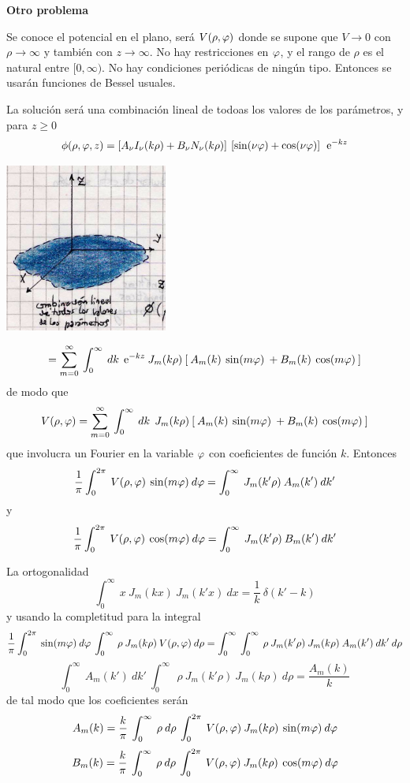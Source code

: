 \documentclass[10pt,oneside]{CBFT_book}
\begin{document}
\begin{ejemplo}{\bf Otro problema}
 
Se conoce el potencial en el plano, será $V(\rho,\varphi)$ donde se supone que $V \to 0$
con $\rho\to\infty$ y también con $z\to\infty$.
No hay restricciones en $\varphi$, y el rango de $\rho$ es el natural entre $[0,\infty)$.
No hay condiciones periódicas de ningún tipo.
Entonces se usarán funciones de Bessel usuales.

La solución será una combinación lineal de todoas los valores de los parámetros,
y para $z\geq 0$
\[
	\phi(\rho,\varphi,z) = \left[ A_{\nu}I_{\nu}(k\rho) + B_{\nu}N_{\nu}(k\rho) \right] \: 
	\left[ \sin(\nu\varphi) + \cos(\nu\varphi) \right] \: \:\mathrm{e}^{-kz}
\]
 
\includegraphics[width=0.4\textwidth]{images/fig_ft1_sep_cilin_B.jpg} 

\[
	= \sum_{m=0}^\infty \: \int_0^{\infty} \: dk \:
	\:\mathrm{e}^{-kz} \: J_{m}(k\rho) \: 
	[ \: A_m(k) \: \sin(m\varphi) \: + B_m(k) \: \cos(m\varphi) \: ]
\]
de modo que
\[
	V(\rho,\varphi) = \sum_{m=0}^\infty \: \int_0^{\infty} \: dk \:
	\: J_{m}(k\rho) \: 
	[ \: A_m(k) \: \sin(m\varphi) \: + B_m(k) \: \cos(m\varphi) \: ]
\]
que involucra un Fourier en la variable $\varphi$ con coeficientes de función $k$.
Entonces
\[
	\frac{1}{\pi} \int_0^{2\pi} \: V(\rho,\varphi) \: \sin(m\varphi) \: d\varphi = 
	\int_0^{\infty} \: J_{m}(k'\rho) \: A_m(k') \: dk'
\]
y
\[
	\frac{1}{\pi} \int_0^{2\pi} \: V(\rho,\varphi) \: \cos(m\varphi) \: d\varphi = 
	\int_0^{\infty} \: J_{m}(k'\rho) \: B_m(k') \: dk'
\]

La ortogonalidad
\[
	\int_0^{\infty} \: x \: J_{m}(kx) \: J_{m}(k'x) \: dx = \frac{1}{k} \: \delta(k'-k)
\]
y usando la completitud para la integral
\[
	\frac{1}{\pi} \int_0^{2\pi} \:  \sin(m\varphi) \: d\varphi \: 
	\int_0^{\infty} \: \rho \: J_{m}(k\rho) \:V(\rho,\varphi) \: d\rho =
	\int_0^{\infty} \: \int_0^{\infty} \: \rho \: J_{m}(k'\rho) \: J_{m}(k\rho) \: A_m(k') \: dk' \: d\rho
\] 
\[
	\int_0^{\infty} \: A_m(k') \: dk' \: \int_0^{\infty} \: 
	\: \rho \: J_{m}(k'\rho) \: J_{m}(k\rho) \: d\rho = \frac{A_m(k)}{k}
\]
de tal modo que los coeficientes serán
\[
	A_m(k) = \frac{k}{\pi} \: \int_0^{\infty} \: \rho \: d\rho \: 
	\int_0^{2\pi} \: V(\rho,\varphi) \: J_{m}(k\rho) \: \sin(m\varphi) \: d\varphi
\]
\[
	B_m(k) = \frac{k}{\pi} \: \int_0^{\infty} \: \rho \: d\rho \: 
	\int_0^{2\pi} \: V(\rho,\varphi) \: J_{m}(k\rho) \: \cos(m\varphi) \: d\varphi
\]


\end{ejemplo}
\end{document}
